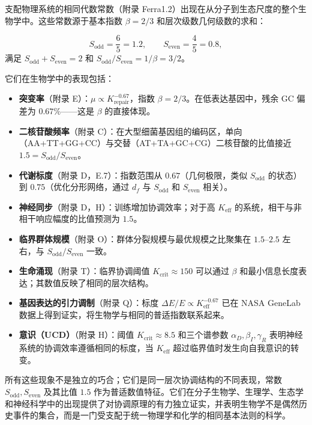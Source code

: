 \documentclass[12pt,a4paper]{article}
\theoremstyle{remark}
\begin{document}
		支配物理系统的相同代数常数（附录 Ferra1.2）出现在从分子到生态尺度的整个生物学中。这些常数源于基本指数 $\beta = 2/3$ 和层次级数几何级数的求和：
		
		\[
		S_{\mathrm{odd}} = \frac{6}{5}=1.2,\qquad S_{\mathrm{even}} = \frac{4}{5}=0.8,
		\]
		满足 $S_{\mathrm{odd}}+S_{\mathrm{even}}=2$ 和 $S_{\mathrm{odd}}/S_{\mathrm{even}} = 1/\beta = 3/2$。
		
		它们在生物学中的表现包括：
		
		\begin{itemize}
			\item \textbf{突变率}（附录 E）：$\mu \propto K_{\mathrm{repair}}^{-0.67}$，指数 $\beta = 2/3$。在低表达基因中，残余 GC 偏差为 $0.67\%$——这是 $\beta$ 的直接体现。
			\item \textbf{二核苷酸频率}（附录 C）：在大型细菌基因组的编码区，单向（AA+TT+GG+CC）与交替（AT+TA+GC+CG）二核苷酸的比值接近 $1.5 = S_{\mathrm{odd}}/S_{\mathrm{even}}$。
			\item \textbf{代谢标度}（附录 D，E.7）：指数范围从 $0.67$（几何极限，类似 $S_{\mathrm{odd}}$ 的状态）到 $0.75$（优化分形网络，通过 $d_f$ 与 $S_{\mathrm{odd}}$ 和 $S_{\mathrm{even}}$ 相关）。
			\item \textbf{神经同步}（附录 D，H）：训练增加协调效率；对于高 $K_{\mathrm{eff}}$ 的系统，相干与非相干响应幅度的比值预测为 $1.5$。
			\item \textbf{临界群体规模}（附录 O）：群体分裂规模与最优规模之比聚集在 $1.5$--$2.5$ 左右，与 $S_{\mathrm{odd}}/S_{\mathrm{even}}$ 一致。
			\item \textbf{生命涌现}（附录 T）：临界协调阈值 $K_{\mathrm{crit}} \approx 150$ 可以通过 $\beta$ 和最小信息长度表达；其数值反映了相同的层次结构。
			\item \textbf{基因表达的引力调制}（附录 Q）：标度 $\Delta E/E \propto K_{\mathrm{eff}}^{-0.67}$ 已在 NASA GeneLab 数据上得到证实，将生物学与相同的普适指数联系起来。
			\item \textbf{意识（UCD）}（附录 H）：阈值 $K_{\mathrm{crit}} \approx 8.5$ 和三个谱参数 $\alpha_D,\beta_I,\gamma_R$ 表明神经系统的协调效率遵循相同的标度，当 $K_{\mathrm{eff}}$ 超过临界值时发生向自我意识的转变。
		\end{itemize}
		
		所有这些现象不是独立的巧合；它们是同一层次协调结构的不同表现，常数 $S_{\mathrm{odd}}, S_{\mathrm{even}}$ 及其比值 $1.5$ 作为普适数值特征。它们在分子生物学、生理学、生态学和神经科学中的出现提供了对协调原理的有力独立证实，并表明生物学不是偶然历史事件的集合，而是一门受支配于统一物理学和化学的相同基本法则的科学。
		
\end{document}
